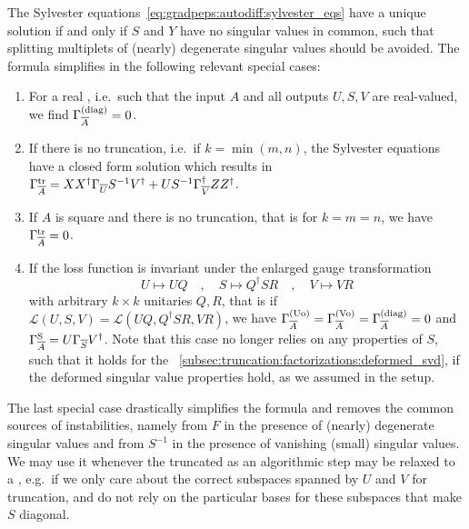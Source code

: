 The Sylvester equations~\eqref{eq:gradpeps:autodiff:sylvester_eqs} have a unique solution if and only if $S$ and $Y$ have no singular values in common, such that splitting multiplets of (nearly) degenerate singular values should be avoided.
%
The formula simplifies in the following relevant special cases:


\begin{enumerate}
    \item
    For a real , i.e.~such that the input $A$ and all outputs $U, S, V$ are real-valued, we find $\Gamma^\text{(diag)}_{\overline{A}} = 0$.
    
    \item
    If there is no truncation, i.e.~if $k=\min(m, n)$, the Sylvester equations have a closed form solution which results in $\Gamma^\text{tr}_{\overline{A}} = XX^\dagger\Gamma_{\overline{U}}S^{-1}V^\dagger + U S^{-1} \Gamma_{\overline{V}}^\dagger Z Z^\dagger$.

    \item
    If $A$ is square and there is no truncation, that is for $k = m = n$, we have $\Gamma^\text{tr}_{\overline{A}} = 0$.

    \item
    If the loss function is invariant under the enlarged gauge transformation
    \begin{equation}
        \label{eq:gradpeps:autodiff:svd_enlarged_gauge_trafo}
        U \mapsto UQ
        \quad , \quad
        S \mapsto Q^\dagger S R
        \quad , \quad
        V \mapsto V R
    \end{equation}
    with arbitrary $k \times k$ unitaries $Q, R$, that is if $\mathcal{L}(U, S, V) = \mathcal{L}(UQ, Q^\dagger SR, VR)$, we have $\Gamma_{\overline{A}}^\text{(Uo)} = \Gamma_{\overline{A}}^\text{(Vo)} = \Gamma_{\overline{A}}^\text{(diag)} = 0$ and $\Gamma_{\overline{A}}^\mathrm{S} = U \Gamma_{\overline{S}} V^\dagger$.
    Note that this case no longer relies on any properties of $S$, such that it holds for the ~\eqref{subsec:truncation:factorizations:deformed_svd}, if the deformed singular value properties hold, as we assumed in the setup.
\end{enumerate}

The last special case drastically simplifies the  formula and removes the common sources of instabilities, namely from $F$ in the presence of (nearly) degenerate singular values and from $S^{-1}$ in the presence of vanishing (small) singular values.
%
We may use it whenever the truncated  as an algorithmic step may be relaxed to a , e.g.~if we only care about the correct subspaces spanned by $U$ and $V$ for truncation, and do not rely on the particular bases for these subspaces that make $S$ diagonal.





